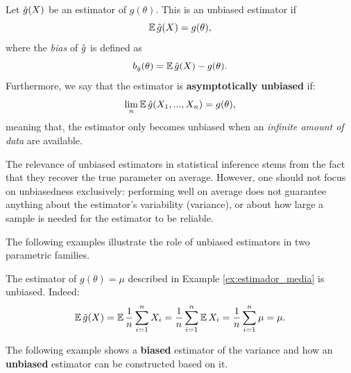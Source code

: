 \begin{definition}
	\label{def:estimador_insesgado}
	Let ${ \hat{g}(X)}$ be an estimator of $g(\theta)$. This is an unbiased estimator if
	\begin{equation}
	\nonumber
		\operatorname{\mathbb{E}}{{ \hat{g}(X)}} = g(\theta),
	\end{equation}
	where the \emph{bias} of ${ \hat{g}}$ is defined as
	\begin{equation}
	\nonumber
		b_{ \hat{g}}(\theta) = \operatorname{\mathbb{E}}{{ \hat{g}(X)}} - g(\theta).
	\end{equation}
	Furthermore, we say that the estimator is \textbf{asymptotically unbiased} if:
	\[\lim_n\operatorname{\mathbb{E}}{{ \hat{g}} (X_1,...,X_n)} = g(\theta),\]
	meaning that, the estimator only becomes unbiased when an \emph{infinite amount of data} are available.
\end{definition}

\begin{remark}
The relevance of unbiased estimators in statistical inference stems from the fact that they recover the true parameter on average. However, one should not focus on unbiasedness exclusively: performing well on average does not guarantee anything about the estimator's variability (variance), or about how large a sample is needed for the estimator to be reliable.
\end{remark}

The following examples illustrate the role of unbiased estimators in two parametric families. 

\begin{example}
	\label{ex:estimador_in_media}
	The estimator of $g(\theta) =  \mu$ described in Example \ref{ex:estimador_media} is unbiased. Indeed: 
	\begin{equation}
	\nonumber
		\operatorname{\mathbb{E}}{{ \hat{g}(X)}} = \operatorname{\mathbb{E}}{\frac{1}{n}\sum_{i=1}^nX_i}	= \frac{1}{n}\sum_{i=1}^n\operatorname{\mathbb{E}}{X_i}		= \frac{1}{n}\sum_{i=1}^n\mu = \mu.
	\end{equation}
\end{example}

The following example shows a \textbf{biased} estimator of the variance and how an \textbf{unbiased} estimator can be constructed based on it. 

